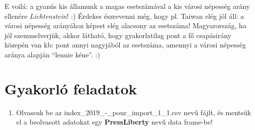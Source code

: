 \documentclass[
]{book}
\providecommand{\tightlist}{%
  \setlength{\itemsep}{0pt}\setlength{\parskip}{0pt}}
\begin{document}
E voilá: a gyanús kis államunk a magas esetszámával a kis városi népesség arány ellenére \emph{Lichtenstein}! :) Érdekes észrevenni még, hogy pl. Taiwan elég jól áll: a városi népesség arányához képest elég alacsony az esetszáma! Magyarország, ha jól szemmelverjük, akkor látható, hogy gyakorlatilag pont a fő csapásirány közepén van kb: pont annyi nagyjából az esetszáma, amennyi a városi népesség aránya alapján ``lennie kéne''. :)

\section*{Gyakorló feladatok}\label{gyakorluxf3-feladatok}

\begin{enumerate}
\def\labelenumi{\arabic{enumi}.}
\tightlist
\item
  Olvassuk be az index\_2019\_-\_pour\_import\_1\_1.csv nevű fájlt, és mentsük el a beolvasott adatokat egy \textbf{PressLiberty} nevű data frame-be!


\end{enumerate}
\end{document}

